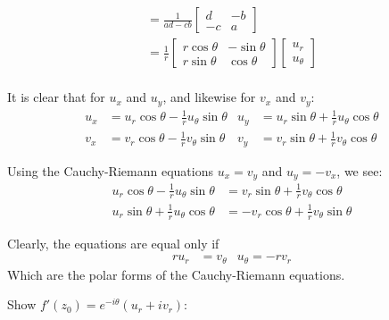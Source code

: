 \documentclass[12pt, english]{book}
\makeatletter
\renewenvironment{proof}[1][\proofname]{\par
	\pushQED{\qed}%
	\normalfont \topsep6\p@\@plus6\p@\relax
	\list{}{%
		\settowidth{\leftmargin}{\itshape\proofname:\hskip\labelsep}%
		\setlength{\labelwidth}{0pt}%
		\setlength{\itemindent}{-\leftmargin}%
	}%
	\item[\hskip\labelsep\itshape#1\@addpunct{:}]\ignorespaces
	}{ \popQED\endlist\@endpefalse}
\makeatother
\begin{document}
\begin{proof}
{\begin{align*}
				  	  &=
				  	  \frac{1}{ad - cb}
				  	  \begin{bmatrix}
				  	  	d & -b \\
				  	  	-c & a
				  	  \end{bmatrix} \\
				&= \frac{1}{r}
					\begin{bmatrix}
						r\cos\theta & -\sin\theta \\
						r\sin\theta & \cos\theta
					\end{bmatrix}
					\begin{bmatrix}
						u_r \\ u_\theta
					\end{bmatrix} & \\
			\end{align*}
		
			It is clear that for \(u_x\) and \(u_y\), and likewise for \(v_x\) and \(v_y\):
			\begin{align}
				\label{Cauchy-Riemann Equations (Polar) Theorem Proof Eqn 1 - Complex}
				u_x &= u_r \cos\theta - \frac{1}{r} u_\theta \sin\theta & 
				u_y &= u_r \sin\theta + \frac{1}{r} u_\theta \cos\theta \\
				\label{Cauchy-Riemann Equations (Polar) Theorem Proof Eqn 2 - Complex}
				v_x &= v_r \cos\theta - \frac{1}{r} v_\theta \sin\theta & 
				v_y &= v_r \sin\theta + \frac{1}{r} v_\theta \cos\theta 
			\end{align}
		
			Using the Cauchy-Riemann equations \(u_x = v_y\) and \(u_y = -v_x\), we see:
			\begin{align*}
				u_r \cos\theta - \frac{1}{r}u_\theta \sin\theta 
					&= v_r \sin\theta + \frac{1}{r} v_\theta \cos\theta \\
				u_r \sin\theta + \frac{1}{r}u_\theta \cos\theta 
					&= -v_r \cos\theta + \frac{1}{r} v_\theta \sin\theta
			\end{align*}
		
			Clearly, the equations are equal only if 
			\begin{align*}
				ru_r &= v_\theta & u_\theta = -rv_r
			\end{align*}
			Which are the polar forms of the Cauchy-Riemann equations.	
		}
		
		Show \(f'(z_0) = e^{-i\theta}(u_r + iv_r)\):
		

\end{proof}
\end{document}

